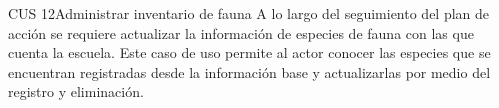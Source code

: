 
\begin{UseCase}{CUS 12}{Administrar inventario de fauna}
    {
    A lo largo del seguimiento del plan de acción se requiere actualizar la información de especies de fauna con las que cuenta la escuela. Este caso de uso permite al actor conocer las especies que se encuentran registradas desde la información base y actualizarlas por medio del registro y eliminación. 
    }
    
    
    


\end{UseCase}
